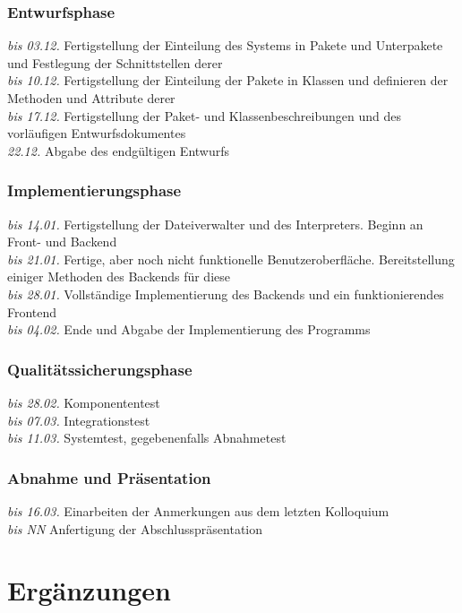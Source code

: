 \documentclass[parskip=full]{scrartcl}
\begin{document}
\subsubsection{Entwurfsphase}
\textit{bis 03.12.} Fertigstellung der Einteilung des Systems in Pakete und Unterpakete und Festlegung der Schnittstellen derer \\
\textit{bis 10.12.} Fertigstellung der Einteilung der Pakete in Klassen und definieren der Methoden und Attribute derer \\
\textit{bis 17.12.} Fertigstellung der Paket- und Klassenbeschreibungen und des vorläufigen Entwurfsdokumentes\\
\textit{22.12.} Abgabe des endgültigen Entwurfs

\subsubsection{Implementierungsphase}
\textit{bis 14.01.} Fertigstellung der Dateiverwalter und des \gls{Interpreter}s. Beginn an Front- und Backend\\
\textit{bis 21.01.} Fertige, aber noch nicht funktionelle Benutzeroberfläche. Bereitstellung einiger Methoden des Backends für diese\\
\textit{bis 28.01.} Vollständige Implementierung des Backends und ein funktionierendes Frontend\\
\textit{bis 04.02.} Ende und Abgabe der Implementierung des Programms

\subsubsection{Qualitätssicherungsphase}
\textit{bis 28.02.} Komponententest\\
\textit{bis 07.03.} Integrationstest\\
\textit{bis 11.03.} Systemtest, gegebenenfalls Abnahmetest\\

\subsubsection{Abnahme und Präsentation }
\textit{bis 16.03.} Einarbeiten der Anmerkungen aus dem letzten Kolloquium \\
\textit{bis NN} Anfertigung der Abschlusspräsentation
\newpage
\section{Ergänzungen}
\end{document}
